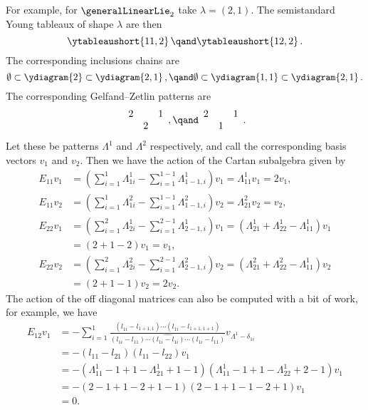 For example, for \(\generalLinearLie_2\) take \(\lambda = (2, 1)\).
The semistandard Young tableaux of shape \(\lambda\) are then
\begin{equation}
    \ytableaushort{11,2}\, \qand \ytableaushort{12,2}\,.
\end{equation}
The corresponding inclusions chains are
\begin{equation}
    \emptyset \subset \ydiagram{2} \subset \ydiagram{2,1}\,, \qand \emptyset \subset \ydiagram{1,1} \subset \ydiagram{2,1}\,.
\end{equation}
The corresponding Gelfand--Zetlin patterns are
\begin{equation}
    \begin{array}{ccc}
        2 && 1\\
        & 2
    \end{array}
    ,\qand 
    \begin{array}{ccc}
        2 && 1\\
        & 1
    \end{array}
    .
\end{equation}
Let these be patterns \(\Lambda^1\) and \(\Lambda^2\) respectively, and call the corresponding basis vectors \(v_1\) and \(v_2\).
Then we have the action of the Cartan subalgebra given by
\begin{align}
    E_{11}v_1 &= \left( \sum_{i=1}^1 \Lambda^1_{1i} - \sum_{i=1}^{1-1} \Lambda^1_{1-1,i} \right)v_1 = \Lambda^1_{11} v_1 = 2v_1,\\
    E_{11}v_2 &= \left( \sum_{i=1}^1 \Lambda^2_{1i} - \sum_{i=1}^{1-1} \Lambda^2_{1-1,i} \right)v_2 = \Lambda^2_{21} v_2 = v_2,\\
    E_{22}v_1 &= \left( \sum_{i=1}^2 \Lambda^1_{2i} - \sum_{i=1}^{2-1} \Lambda^1_{2-1,i} \right)v_1 = (\Lambda^1_{21} + \Lambda^1_{22} - \Lambda^1_{11})v_1\\
    &= (2 + 1 - 2)v_1 = v_1,\\
    E_{22}v_2 &= \left( \sum_{i=1}^2 \Lambda^2_{2i} - \sum_{i=1}^{2-1} \Lambda^2_{2-1,i} \right)v_2 = (\Lambda^2_{21} + \Lambda^2_{22} - \Lambda^1_{11})v_2\\
    &= (2 + 1 - 1)v_2 = 2v_2.
\end{align}
The action of the off diagonal matrices can also be computed with a bit of work, for example, we have
\begin{align}
    E_{12}v_1 &= -\sum_{i=1}^1 \frac{(l_{1i} - l_{1+1,1}) \dotsm (l_{1i} - l_{1+1,1+1})}{(l_{1i} - l_{11}) \dotsm \widehat{(l_{1i} - l_{1i})} \dotsm (l_{1i} - l_{11})}v_{\Lambda^1 - \delta_{1i}}\\
    &= - (l_{11} - l_{21}) (l_{11} - l_{22})v_1\\
    &= - (\Lambda^1_{11} - 1 + 1 - \Lambda^1_{21} +1 - 1) (\Lambda^1_{11} - 1 + 1 - \Lambda^1_{22} + 2 - 1)v_1\\
    &= -(2 - 1 + 1 - 2 + 1 - 1) (2 - 1 + 1 - 1 - 2 + 1)v_1\\
    &= 0.
\end{align}